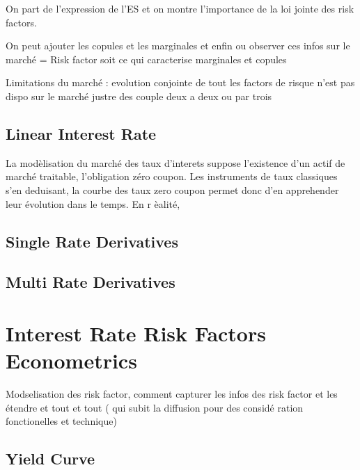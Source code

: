 \documentclass[3pt]{article}
\begin{document}
\bigskip 

On part de l'expression de l'ES et on montre l'importance de la loi jointe
des risk factors.

On peut ajouter les copules et les marginales et enfin ou observer ces infos
sur le march\'{e} =\TEXTsymbol{>} Risk factor soit ce qui caracterise
marginales et copules

Limitations du march\'{e} : evolution conjointe de tout les factors de
risque n'est pas dispo sur le march\'{e} justre des couple deux a deux ou
par trois

\subsection{Linear Interest Rate}

La mod\`{e}lisation du march\'{e} des taux d'interets suppose l'existence
d'un actif de march\'{e} traitable, l'obligation z\'{e}ro coupon. Les
instruments de taux classiques s'en deduisant, la courbe des taux zero
coupon permet donc d'en apprehender leur \'{e}volution dans le temps. En r%
\`{e}alit\'{e},

\bigskip

\subsection{Single Rate Derivatives}

\subsection{Multi Rate Derivatives}

\bigskip

\bigskip

\bigskip

\bigskip

\bigskip

\bigskip

\bigskip

\bigskip

\section{Interest Rate Risk Factors Econometrics}

Modselisation des risk factor, comment capturer les infos des risk factor et
les \'{e}tendre et tout et tout ( qui subit la diffusion pour des consid\'{e}%
ration fonctionelles et technique)

\subsection{Yield Curve}
\end{document}
